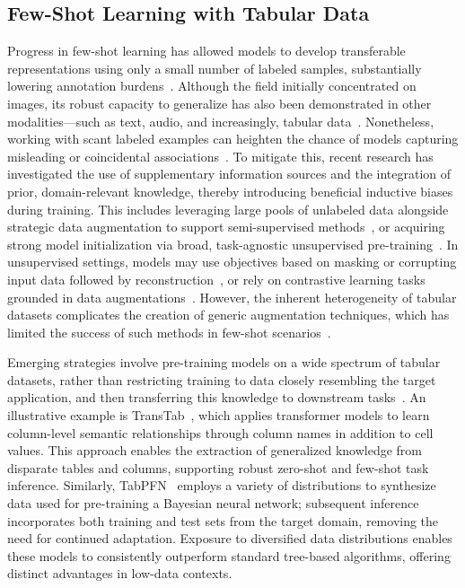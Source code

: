 \subsection{Few-Shot Learning with Tabular Data} Progress in few-shot learning has allowed models to develop transferable representations using only a small number of labeled samples, substantially lowering annotation burdens~\cite{chen2018closer}. Although the field initially concentrated on images, its robust capacity to generalize has also been demonstrated in other modalities—such as text, audio, and increasingly, tabular data~\cite{majumder2022few,nam2023stunt,schick2021exploiting}. Nonetheless, working with scant labeled examples can heighten the chance of models capturing misleading or coincidental associations~\cite{bartlett2021deep}. To mitigate this, recent research has investigated the use of supplementary information sources and the integration of prior, domain-relevant knowledge, thereby introducing beneficial inductive biases during training. This includes leveraging large pools of unlabeled data alongside strategic data augmentation to support semi-supervised methods~\cite{ucar2021subtab,yoon2020vime}, or acquiring strong model initialization via broad, task-agnostic unsupervised pre-training~\cite{somepalli2021saint}. In unsupervised settings, models may use objectives based on masking or corrupting input data followed by reconstruction~\cite{arik2021tabnet,majmundar2022met}, or rely on contrastive learning tasks grounded in data augmentations~\cite{bahri2022scarf,chen2020simple}. However, the inherent heterogeneity of tabular datasets complicates the creation of generic augmentation techniques, which has limited the success of such methods in few-shot scenarios~\cite{nam2023stunt}.

Emerging strategies involve pre-training models on a wide spectrum of tabular datasets, rather than restricting training to data closely resembling the target application, and then transferring this knowledge to downstream tasks~\cite{zhang2023generative,levin2022transfer,zhu2023xtab}. An illustrative example is TransTab~\cite{wang2022transtab}, which applies transformer models to learn column-level semantic relationships through column names in addition to cell values. This approach enables the extraction of generalized knowledge from disparate tables and columns, supporting robust zero-shot and few-shot task inference. Similarly, TabPFN~\cite{hollmann2022tabpfn} employs a variety of distributions to synthesize data used for pre-training a Bayesian neural network; subsequent inference incorporates both training and test sets from the target domain, removing the need for continued adaptation. Exposure to diversified data distributions enables these models to consistently outperform standard tree-based algorithms, offering distinct advantages in low-data contexts.

